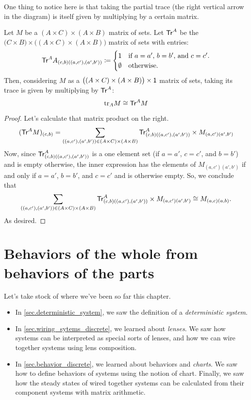 \documentclass[DynamicalBook]{subfiles}
\begin{document}
One thing to notice here is that taking the partial trace (the right vertical
arrow in the diagram) is itself given by multiplying by a certain matrix.
\begin{proposition}\label{prop.trace_multiplying_by_matrix}
  Let $M$ be a $(A \times C) \times (A \times B)$ matrix of sets. Let
  $\mathsf{Tr}^A$ be the $\big(C \times B \big) \times \big((A \times C) \times (A
  \times B)\big)$ matrix of sets with entries:
  \[
    \mathsf{Tr}^A{A}_{(c, b)((a,c'),(a', b'))} \coloneqq \begin{cases} 
      \mathsf{1} &\mbox{if $a = a'$, $b = b'$, and $c = c'$.} \\
      \emptyset &\mbox{otherwise.}
    \end{cases} 
\]
  Then, considering $M$ as a $\big((A \times C) \times (A \times B)\big) \times
  \mathsf{1}$ matrix of sets, taking its trace is given by multiplying by $\mathsf{Tr}^A$:
$$\mathrm{tr}_{A}M \cong \mathsf{Tr}^A M$$
\end{proposition}
\begin{proof}
  Let's calculate that matrix product on the right.
  \begin{align*}
    (\mathsf{Tr}^A M)_{(c, b)} &= \sum_{((a, c'), (a', b')) \in (A \times C) \times (A \times B)} \mathsf{Tr}^A_{(c,b)((a, c'),(a', b'))} \times M_{(a,c')(a',b')} \\
  \end{align*}
  Now, since $\mathsf{Tr}^A_{(c,b)((a,c'),(a',b'))}$ is a one element set (if $a =
  a'$, $c = c'$, and $b = b'$) and is empty otherwise, the inner expression has
  the elements of $M_{(a,c')(a', b')}$ if and only if $a = a'$, $b = b'$, and $c
  = c'$ and is otherwise empty. So, we conclude that
  \[
\sum_{((a, c'), (a', b')) \in (A \times C) \times (A \times B)}
\mathsf{Tr}^A_{(c,b)((a, c'),(a', b'))} \times M_{(a,c')(a',b')} \cong M_{(a, c)(a,
  b)}.
\]
As desired.
\end{proof}

\section{Behaviors of the whole from behaviors of the parts}\label{sec.representables}

Let's take stock of where we've been so far this chapter.
\begin{itemize}
  \item In \cref{sec.deterministic_system}, we saw the definition of a
    \emph{deterministic system}.
  \item In \cref{sec.wiring_sytems_discrete}, we learned about \emph{lenses}. We saw how systems can be
    interpreted as special sorts of lenses, and how we can wire together systems
    using lens composition.
  \item In \cref{sec.behavior_discrete}, we learned about behaviors and \emph{charts}. We saw
    how to define behaviors of systems using the notion of chart. Finally, we
    saw how the steady states of wired together systems can be calculated from their
    component systems with matrix arithmetic.
\end{itemize}
\end{document}
